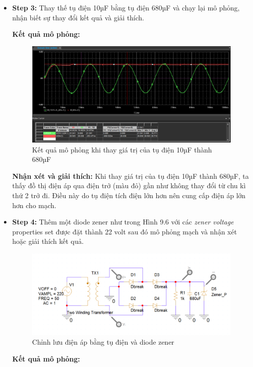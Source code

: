 \begin{itemize}
    \item \textbf{Step 3:} Thay thế tụ điện 10µF bằng tụ điện 680µF và chạy lại mô phỏng,
    nhận biết sự thay đổi kết quả và giải thích.
 \pagebreak

    \textbf{Kết quả mô phỏng: } 

    \begin{figure}[ht]
        \centering
        \includegraphics[scale= 0.2]{graphics/ex9/f5.png}
        \caption{Kết quả mô phỏng khi thay giá trị của tụ điện 10µF thành 680µF}
    \end{figure}

    \textbf{Nhận xét và giải thích:} Khi thay giá trị của tụ điện 10µF thành 680µF, ta thấy đồ thị điện áp qua điện trở (màu đỏ) gần như không thay đổi từ chu kì thứ 2 trở đi. Điều này do tụ điện tích điện lớn hơn nên cung cấp điện áp lớn hơn cho mạch.

\item \textbf{Step 4:} Thêm một diode zener như trong Hình 9.6 với các \textit{zener voltage} properties set được đặt thành
22 volt sau đó mô phỏng mạch và nhận xét hoặc giải thích kết quả.

\begin{figure}[ht]
    \centering
    \includegraphics[scale= 0.23]{graphics/ex9/f6.png}
    \caption{Chỉnh lưu điện áp bằng tụ điện và diode zener}
\end{figure}
\pagebreak
\textbf{Kết quả mô phỏng: } 


\end{itemize}
